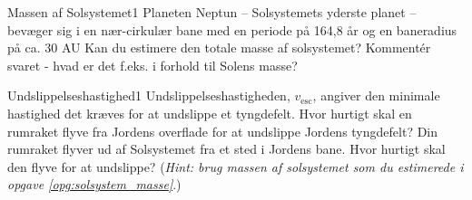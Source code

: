 
\begin{opgave}{Massen af Solsystemet}{1}
\label{opg:solsystem_masse}
Planeten Neptun -- Solsystemets yderste planet -- bevæger sig i en nær-cirkulær bane med en periode på 164,8 år og en baneradius på ca. 30 AU
\opg Kan du estimere den totale masse af solsystemet? Kommentér svaret - hvad er det f.eks. i forhold til Solens masse?
\end{opgave}

\begin{opgave}{Undslippelseshastighed}{1}
Undslippelseshastigheden, $v_\text{esc}$, angiver den minimale hastighed det kræves for at undslippe et tyngdefelt.
\opg Hvor hurtigt skal en rumraket flyve fra Jordens overflade for at undslippe Jordens tyngdefelt?
\opg Din rumraket flyver ud af Solsystemet fra et sted i Jordens bane. Hvor hurtigt skal den flyve for at undslippe? (\emph{Hint: brug massen af solsystemet som du estimerede i opgave \ref{opg:solsystem_masse}}.)
\end{opgave}

